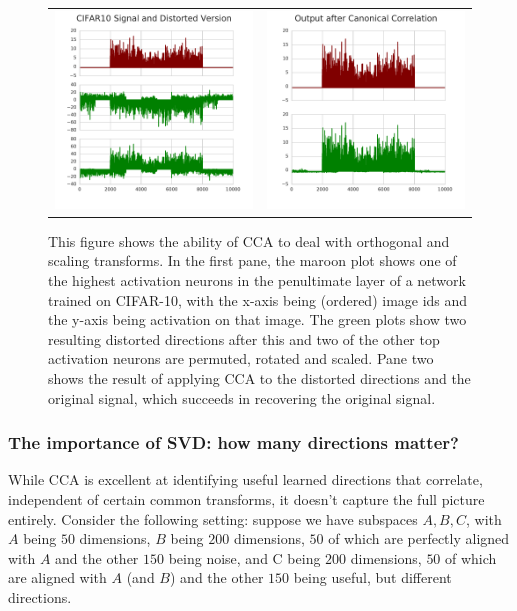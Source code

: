\documentclass{article} %
\begin{document}
\begin{figure}[ht]
   \centering
   \begin{tabular}{cc}
\includegraphics[width=0.5\columnwidth]{figures_nips/Signal_and_Distorted.pdf}
 &
\includegraphics[width=0.5\columnwidth]{figures_nips/Aligned_by_CCA.pdf}
\end{tabular}
   \caption{This figure shows the ability of CCA to deal with orthogonal and scaling transforms. In the first pane, the maroon plot shows one of the highest activation neurons in the penultimate layer of a network trained on CIFAR-10, with the x-axis being (ordered) image ids and the y-axis being activation on that image. The green plots show two resulting distorted directions after this and two of the other top activation neurons are permuted, rotated and scaled. Pane two shows the result of applying CCA to the distorted directions and the original signal, which succeeds in recovering the original signal.
}
   \label{fig-CCA-invariances}
   \vspace*{-0.9em}
 \end{figure}
 
 \subsubsection{The importance of SVD: how many directions matter?}
While CCA is excellent at identifying useful learned directions that correlate, independent of certain common transforms, it doesn't capture the full picture entirely. Consider the following setting: suppose we have subspaces $A, B, C$, with $A$ being $50$ dimensions, $B$ being $200$ dimensions, $50$ of which are perfectly aligned with $A$ and the other $150$ being noise, and C being $200$ dimensions, $50$ of which are aligned with $A$ (and $B$) and the other $150$ being useful, but different directions. 
\end{document}
